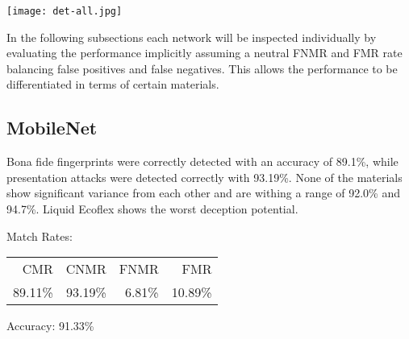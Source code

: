 \noindent
\begin{minipage}{0.5\textwidth}
    
\end{minipage}%
\begin{minipage}{0.5\textwidth}
    \texttt{[image: det-all.jpg]}
\end{minipage}


\smallskip\noindent
In the following subsections each network will be inspected individually by evaluating the performance implicitly assuming a neutral FNMR and FMR rate balancing false positives and false negatives.
This allows the performance to be differentiated in terms of certain materials.


\bigskip
\subsection{MobileNet}
\begin{minipage}[c]{0.7\textwidth}
    Bona fide fingerprints were correctly detected with an accuracy of 89.1\%, while presentation attacks were detected correctly with 93.19\%.
    None of the materials show significant variance from each other and are withing a range of 92.0\% and 94.7\%.
    Liquid Ecoflex shows the worst deception potential.

    \medskip\noindent\centering Match Rates: 
    \begin{tabular}{ r  r  r  r |}
        CMR     & CNMR          & FNMR                 & FMR    \\
        89.11\% & 93.19\%       & 6.81\%               & 10.89\% \\
    \end{tabular} \hspace{2mm} Accuracy: 91.33\%
\end{minipage}
\hfill
\begin{minipage}[c]{0.3\textwidth}
    \centering
    
\end{minipage}


\bigskip

